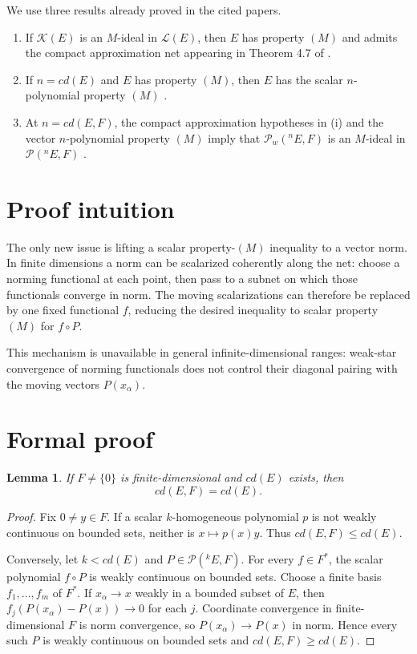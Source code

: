 \documentclass[11pt]{article}
\newtheorem{lemma}[theorem]{Lemma}
\newcommand{\K}{\mathcal K}
\newcommand{\Lop}{\mathcal L}
\newcommand{\Pw}{\mathcal P_w}
\newcommand{\Poly}{\mathcal P}
\begin{document}
We use three results already proved in the cited papers.

\begin{enumerate}[label=(\roman*)]
\item If \(\K(E)\) is an \(M\)-ideal in \(\Lop(E)\), then \(E\) has
property \((M)\) and admits the compact approximation net appearing in
Theorem 4.7 of \cite{DL}.
\item If \(n=cd(E)\) and \(E\) has property \((M)\), then \(E\) has the
scalar \(n\)-polynomial property \((M)\)
\cite[Proposition 3.10]{D}.
\item At \(n=cd(E,F)\), the compact approximation hypotheses in (i) and
the vector \(n\)-polynomial property \((M)\) imply that
\(\Pw(^nE,F)\) is an \(M\)-ideal in \(\Poly(^nE,F)\)
\cite[Theorem 4.7]{DL}.
\end{enumerate}

\section{Proof intuition}

The only new issue is lifting a scalar property-\((M)\) inequality to a
vector norm. In finite dimensions a norm can be scalarized coherently along
the net: choose a norming functional at each point, then pass to a subnet on
which those functionals converge in norm. The moving scalarizations can
therefore be replaced by one fixed functional \(f\), reducing the desired
inequality to scalar property \((M)\) for \(f\circ P\).

This mechanism is unavailable in general infinite-dimensional ranges:
weak-star convergence of norming functionals does not control their diagonal
pairing with the moving vectors \(P(x_\alpha)\).

\section{Formal proof}

\begin{lemma}\label{lem:cd}
If \(F\ne\{0\}\) is finite-dimensional and \(cd(E)\) exists, then
\[
 cd(E,F)=cd(E).
\]
\end{lemma}

\begin{proof}
Fix \(0\ne y\in F\). If a scalar \(k\)-homogeneous polynomial \(p\) is
not weakly continuous on bounded sets, neither is \(x\mapsto p(x)y\).
Thus \(cd(E,F)\le cd(E)\).

Conversely, let \(k<cd(E)\) and \(P\in\Poly(^kE,F)\). For every
\(f\in F^*\), the scalar polynomial \(f\circ P\) is weakly continuous
on bounded sets. Choose a finite basis \(f_1,\dots,f_m\) of \(F^*\).
If \(x_\alpha\to x\) weakly in a bounded subset of \(E\), then
\(f_j(P(x_\alpha)-P(x))\to0\) for each \(j\). Coordinate convergence
in finite-dimensional \(F\) is norm convergence, so
\(P(x_\alpha)\to P(x)\) in norm. Hence every such \(P\) is weakly
continuous on bounded sets and \(cd(E,F)\ge cd(E)\).
\end{proof}
\end{document}
